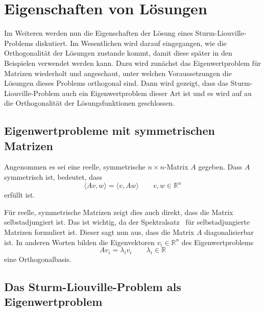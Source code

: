 %
%
%

\section{Eigenschaften von Lösungen
\label{sturmliouville:sec:solution-properties}}

Im Weiteren werden nun die Eigenschaften der Lösung eines
Sturm-Liouville-Problems diskutiert.
Im Wesentlichen wird darauf eingegangen, wie die Orthogonalität der Lösungen
zustande kommt, damit diese später in den Beispielen verwendet werden kann.
Dazu wird zunächst das Eigenwertproblem für Matrizen wiederholt und angeschaut,
unter welchen Voraussetzungen die Lösungen dieses Problems orthogonal sind.
Dann wird gezeigt, dass das Sturm-Liouville-Problem auch ein Eigenwertproblem
dieser Art ist und es wird auf au die Orthogonalität der Lösungsfunktionen
geschlossen.


\subsection{Eigenwertprobleme mit symmetrischen Matrizen
\label{sturmliouville:sec:eigenvalue-problem-matrix}}


Angenommen es sei eine reelle, symmetrische $n \times n$-Matrix $A$ gegeben.
%
%
Dass $A$ symmetrisch ist, bedeutet, dass
\[
    \langle Av, w \rangle
    =
    \langle v, Aw \rangle
    \qquad
    v, w \in \mathbb{R}^n
\]
erfüllt ist.

Für reelle, symmetrische Matrizen zeigt dies auch direkt, dass die Matrix
selbstadjungiert ist.
Das ist wichtig, da der Spektralsatz~\cite{sturmliouville:spektralsatz-wiki}
%
für selbstadjungierte Matrizen formuliert ist. Dieser sagt nun aus, dass die
%
%
Matrix $A$ diagonalisierbar ist.
In anderen Worten bilden die Eigenvektoren $v_i \in \mathbb{R}^n$ des 
Eigenwertproblems
\[
    A v_i
    =
    \lambda_i v_i
    \qquad \lambda_i \in \mathbb{R}
\]
eine Orthogonalbasis.

\subsection{Das Sturm-Liouville-Problem als Eigenwertproblem}

